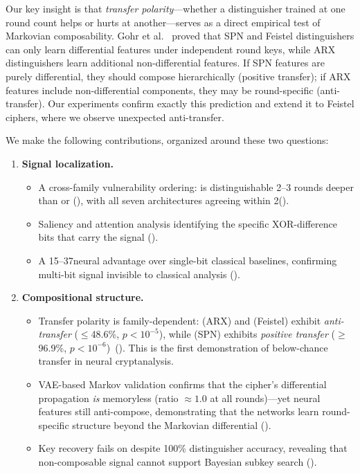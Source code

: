 Our key insight is that \emph{transfer polarity}---whether a distinguisher trained at one round count helps or hurts at another---serves as a direct empirical test of Markovian composability.
Gohr et al.~\citep{gohr2022assessment} proved that SPN and Feistel distinguishers can only learn differential features under independent round keys, while ARX distinguishers learn additional non-differential features.
If SPN features are purely differential, they should compose hierarchically (positive transfer); if ARX features include non-differential components, they may be round-specific (anti-transfer).
Our experiments confirm exactly this prediction and extend it to Feistel ciphers, where we observe unexpected anti-transfer.

We make the following contributions, organized around these two questions:

\begin{enumerate}[leftmargin=*,itemsep=2pt]
  \item \textbf{Signal localization.}
  \begin{itemize}[itemsep=1pt,topsep=2pt]
    \item A cross-family vulnerability ordering: \simon is distinguishable 2--3 rounds deeper than \speck or \present (), with all seven architectures agreeing within 2\pp ().
    \item Saliency and attention analysis identifying the specific XOR-difference bits that carry the signal ().
    \item A 15--37\pp neural advantage over single-bit classical baselines, confirming multi-bit signal invisible to classical analysis ().
  \end{itemize}
  \item \textbf{Compositional structure.}
  \begin{itemize}[itemsep=1pt,topsep=2pt]
    \item Transfer polarity is family-dependent: \speck (ARX) and \simon (Feistel) exhibit \emph{anti-transfer} ($\leq$48.6\%, $p < 10^{-5}$), while \present (SPN) exhibits \emph{positive transfer} ($\geq$96.9\%, $p < 10^{-6}$)~(). This is the first demonstration of below-chance transfer in neural cryptanalysis.
    \item VAE-based Markov validation confirms that the cipher's differential propagation \emph{is} memoryless (ratio $\approx 1.0$ at all rounds)---yet neural features still anti-compose, demonstrating that the networks learn round-specific structure beyond the Markovian differential ().
    \item Key recovery fails on \simon despite 100\% distinguisher accuracy, revealing that non-composable signal cannot support Bayesian subkey search ().
  \end{itemize}
\end{enumerate}


